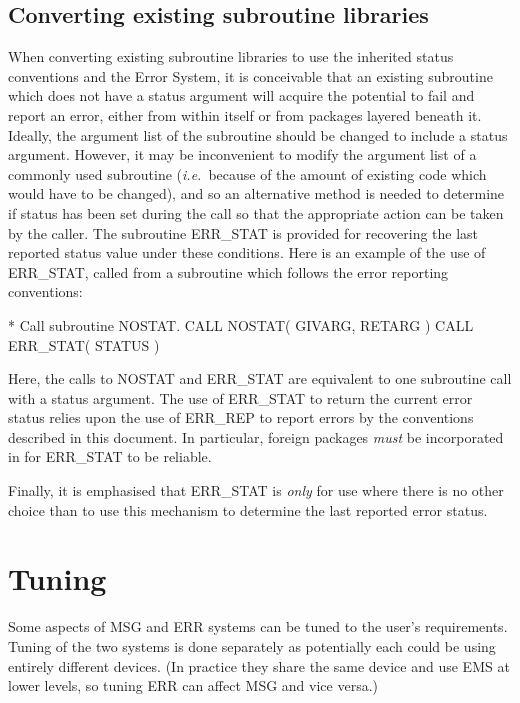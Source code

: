 \documentclass[twoside,11pt]{starlink}
\begin{document}
\subsection{Converting existing subroutine libraries \label{convert_sect}}

When converting existing subroutine
libraries to use the inherited status conventions and the Error System,
it is conceivable that an existing subroutine which does not have a
status argument will acquire the potential to fail and report an error, either
from within itself or from packages layered beneath it.
Ideally, the argument list of the subroutine should be changed to include a
status argument.
However,
it may be inconvenient to modify the argument list of a commonly used
subroutine (\textit{i.e.}\ because of the amount of existing code which would have
to be changed), and so an alternative method is needed to determine if status
has  been set during the
call so that the appropriate action can be taken by the caller.
The subroutine ERR\_STAT is provided for recovering the last reported status
value under these conditions.
Here is an example of the use of ERR\_STAT, called from a subroutine which
follows the error reporting conventions:

\begin {small}
\begin{terminalv}
*  Call subroutine NOSTAT.
      CALL NOSTAT( GIVARG, RETARG )
      CALL ERR_STAT( STATUS )
\end{terminalv}
\end {small}

Here, the calls to NOSTAT and ERR\_STAT are equivalent to one subroutine call
with a status argument.
The use of ERR\_STAT to return the current error status relies upon the use of
ERR\_REP to report errors by the conventions described in this document.
In particular, foreign packages \emph{must} be incorporated in
 for ERR\_STAT to be reliable.

Finally, it is emphasised that ERR\_STAT is \emph{only} for use where there is
no other choice than to use this mechanism to determine the last reported error
status.


\section{Tuning\label{tuning}}
Some aspects of MSG and ERR systems can be tuned to the user's requirements.
Tuning of the two systems is done separately as potentially each could
be using entirely different devices. (In practice they share the same device
and use EMS at lower levels, so tuning ERR can affect MSG and vice versa.)
\end{document}
